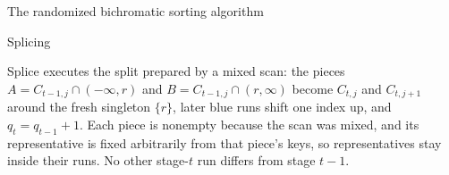 \documentclass[11pt]{article}
\theoremstyle{definition}
\numberwithin{equation}{section}
\begin{document}
\begin{section}{The randomized bichromatic sorting algorithm}
\begin{subsection}{Splicing}
\begin{aiblock}
{\ttfamily Splice} executes the split prepared by a mixed scan: the
pieces $A = C_{t-1,j} \cap (-\infty, r)$ and
$B = C_{t-1,j} \cap (r, \infty)$ become $C_{t,j}$ and $C_{t,j+1}$
around the fresh singleton $\{r\}$, later blue runs shift one
index up, and $q_t = q_{t-1} + 1$. Each piece is nonempty because the scan was mixed, and its representative is fixed arbitrarily from that piece's keys,
so representatives stay inside their runs. No other stage-$t$
run differs from stage $t-1$.

\end{aiblock}

\end{subsection}

\end{section}
\end{document}
